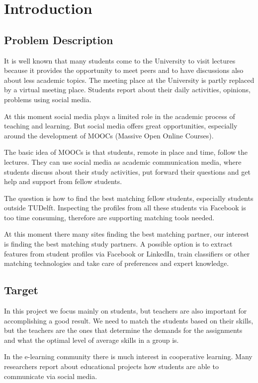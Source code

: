 \chapter{Introduction}

\section{Problem Description}
It is well known that many students come to the University to visit lectures because it provides the opportunity to meet peers and to have discussions also about less academic topics. 
The meeting place at the University is partly replaced by a virtual meeting place. 
Students report about their daily activities, opinions, problems using social media. 

At this moment social media plays a limited role in the academic process of teaching and learning. 
But social media offers great opportunities, especially around the development of MOOCs (Massive Open Online Courses). 

The basic idea of MOOCs is that students, remote in place and time, follow the lectures. 
They can use social media as academic communication media, where students discuss about their study activities, put forward their questions and get help and support from fellow students. 

The question is how to find the best matching fellow students, especially students outside TUDelft. 
Inspecting the profiles from all these students via Facebook is too time consuming, therefore are supporting matching tools needed. 

At this moment there many sites finding the best matching partner, our interest is finding the best matching study partners. 
A possible option is to extract features from student profiles via Facebook or LinkedIn, train classifiers or other matching technologies and take care of preferences and expert knowledge.

\section{Target}
In this project we focus mainly on students, but teachers are also important for accomplishing a good result.
We need to match the students based on their skills, but the teachers are the ones that determine the demands for the assignments and what the optimal level of average skills in a group is.

In the e-learning community there is much interest in cooperative learning. 
Many researchers report about educational projects how students are able to communicate via social media.\cite{rothkrantz2014elearning}

